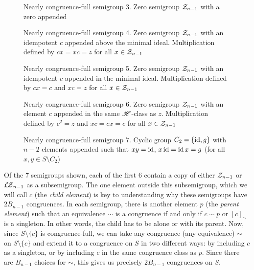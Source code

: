 \begin{figure}[p]
  \centering
  
  \caption[Nearly congruence-full semigroup 3]{Nearly congruence-full semigroup
    3.  Zero semigroup $\mathcal{Z}_{n-1}$ with a zero appended}
  \label{fig:nearfull-3}
\end{figure}

\begin{figure}[p]
  \centering
  
  \caption[Nearly congruence-full semigroup 4]{Nearly congruence-full semigroup
    4.  Zero semigroup $\mathcal{Z}_{n-1}$ with an idempotent $c$ appended above the
    minimal ideal.  Multiplication defined by $cx=xc=z$ for all
    $x \in \mathcal{Z}_{n-1}$}
  \label{fig:nearfull-4}
\end{figure}

\begin{figure}[p]
  \centering
  
  \caption[Nearly congruence-full semigroup 5]{Nearly congruence-full semigroup
    5.  Zero semigroup $\mathcal{Z}_{n-1}$ with an idempotent $c$ appended in the minimal
    ideal.  Multiplication defined by $cx=c$ and $xc=z$ for all
    $x \in \mathcal{Z}_{n-1}$}
  \label{fig:nearfull-5}
\end{figure}

\begin{figure}[p]
  \centering
  
  \caption[Nearly congruence-full semigroup 6]{Nearly congruence-full semigroup
    6.  Zero semigroup $\mathcal{Z}_{n-1}$ with an element $c$ appended in the same
    $\mathrel{\mathscr{H}}$-class as $z$.  Multiplication defined by $c^2=z$ and $xc=cx=c$ for all
    $x \in \mathcal{Z}_{n-1}$}
  \label{fig:nearfull-6}
\end{figure}

\begin{figure}[p]
  \centering
  
  \caption[Nearly congruence-full semigroup 7]{Nearly congruence-full semigroup
    7.  Cyclic group $C_2 = \{\operatorname{id}, g\}$ with $n-2$ elements appended such that
    $xy=\operatorname{id}$, $x \operatorname{id}=\operatorname{id} x=g$ (for all $x,y \in S \setminus C_2$)}
  \label{fig:nearfull-7}
\end{figure}

Of the 7 semigroups shown, each of the first 6 contain a copy of
either $\mathcal{Z}_{n-1}$ or $\mathcal{L\!Z}_{n-1}$ as a subsemigroup.  The one element outside
this subsemigroup, which we will call $c$ (the \textit{child element}) is key to
understanding why these semigroups have $2B_{n-1}$ congruences.  In each
semigroup, there is another element $p$ (the \textit{parent element}) such that
an equivalence $\sim$ is a congruence if and only if $c \sim p$ or $[c]_\sim$ is
a singleton.  In other words, the child has to be alone or with its parent.
Now, since $S \setminus \{c\}$ is congruence-full, we can take any congruence
(any equivalence) $\sim$ on $S \setminus \{c\}$ and extend it to a congruence on
$S$ in two different ways: by including $c$ as a singleton, or by including $c$
in the same congruence class as $p$.  Since there are $B_{n-1}$ choices for
$\sim$, this gives us precisely $2B_{n-1}$ congruences on $S$.

